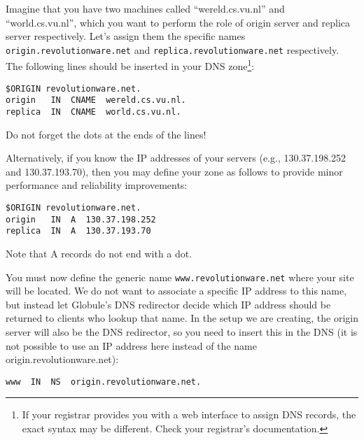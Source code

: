 \documentclass[10pt,a4paper]{article}
\makeatletter
\newenvironment{p}{\@open{P}{}}{\@close{P}}
\newenvironment{p}{}{\par}
\makeatother
\begin{document}
\begin{p}
Imagine that you have two machines called ``wereld.cs.vu.nl'' and
``world.cs.vu.nl'', which you want to perform the role of origin server and
replica server respectively.  Let's assign them the specific names
\verb!origin.revolutionware.net!  and \verb!replica.revolutionware.net!
respectively. The following lines should be inserted in your DNS
zone\footnote{If your registrar provides you with a web interface to assign
DNS records, the exact syntax may be different. Check your registrar's
documentation.}:
\end{p}

\begin{Verbatim}
$ORIGIN revolutionware.net.
origin   IN  CNAME  wereld.cs.vu.nl.
replica  IN  CNAME  world.cs.vu.nl.
\end{Verbatim}

\begin{p}
Do not forget the dots at the ends of the lines!
\end{p}

\begin{p}
Alternatively, if you know the IP addresses of your servers (e.g.,
130.37.198.252 and 130.37.193.70), then you may define your zone as follows to
provide minor performance and reliability improvements:
\end{p}

\begin{Verbatim}
$ORIGIN revolutionware.net.
origin   IN  A  130.37.198.252
replica  IN  A  130.37.193.70
\end{Verbatim}

\begin{p}
Note that A records do not end with a dot.
\end{p}

\begin{p}
You must now define the generic name \verb!www.revolutionware.net!  where your
site will be located.  We do not want to associate a specific IP address to
this name, but instead let Globule's DNS redirector decide which IP address
should be returned to clients who lookup that name.  In the setup we are
creating, the origin server will also be the DNS redirector, so you need to
insert this in the DNS (it is not possible to use an IP address here instead
of the name origin.revolutionware.net):
\end{p}

\begin{Verbatim}
www  IN  NS  origin.revolutionware.net.
\end{Verbatim}
\end{document}
